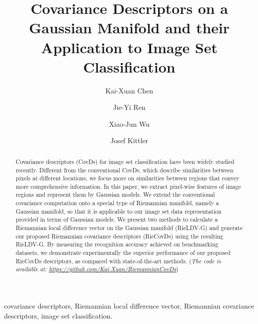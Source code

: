 \documentclass[review]{elsarticle}
\begin{document}
\begin{frontmatter}


\title{Covariance Descriptors on a Gaussian Manifold and their Application to Image Set Classification}




\author[mymainaddress]{Kai-Xuan Chen}
\author[mymainaddress]{Jie-Yi Ren}

\author[mymainaddress]{Xiao-Jun Wu}
\author[mysecondaryaddress]{Josef Kittler}

\address[mymainaddress]{School of Internet of Things Engineering, Jiangnan University, Wuxi 214122, China}
\address[mysecondaryaddress]{Center for Vision, Speech and Signal Processing, University of Surrey, GU2 7XH, Guildford, UK}
\begin{abstract}
Covariance descriptors (CovDs) for image set classification have been widely studied recently.  Different from the conventional CovDs, which describe similarities between pixels at different locations, we focus more on similarities between regions that convey more comprehensive information. In this paper, we extract pixel-wise features of image regions and represent them by Gaussian models. We extend the conventional covariance computation onto a special type of Riemannian manifold, namely a Gaussian manifold, so that it is applicable to our image set data representation provided in terms of Gaussian models. We present two methods to calculate a Riemannian local difference vector on the Gaussian manifold (RieLDV-G) and generate our proposed Riemannian covariance descriptors (RieCovDs) using the resulting RieLDV-G. By measuring the recognition accuracy achieved on benchmarking datasets, we demonstrate experimentally the superior performance of our proposed RieCovDs descriptors, as compared with state-of-the-art methods. (\emph {The code is available at: \url{https://github.com/Kai-Xuan/RiemannianCovDs}})
\end{abstract}

\begin{keyword}
covariance descriptors, Riemannian local difference vector, Riemannian covariance descriptors, image set classification.
\end{keyword}

\end{frontmatter}
\end{document}
